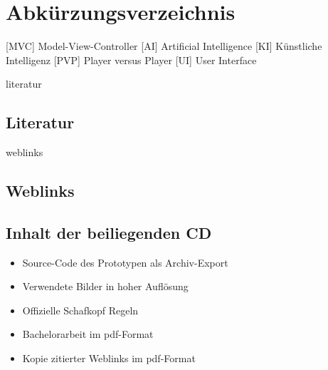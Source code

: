 \documentclass[
							a4paper, 
							11pt, 
							openany, 
							liststotoc,
							parskip=half, 
   							headings=normal
						]{scrreprt}
\begin{document}
{%

\listoffigures

\chapter*{Abkürzungsverzeichnis}
\begin{acronym}[MVC]
 [MVC] {Model-View-Controller}
 [AI] {Artificial Intelligence}
 [KI] {Künstliche Intelligenz}
 [PVP] {Player versus Player}
 [UI] {User Interface}
\end{acronym}

\lstlistoflistings


\begin{btSect}{literatur}
\section*{Literatur}
\btPrintCited
\end{btSect}

\clearpage
\begin{btSect}{weblinks}
\section*{Weblinks}
\btPrintCited
\end{btSect}



\renewcommand{\thesection}{\Alph{section}}
\appendix
{}
\section{Inhalt der beiliegenden CD}
\begin{itemize}
	\item Source-Code des Prototypen als Archiv-Export
	\item Verwendete Bilder in hoher Auflösung
	\item Offizielle Schafkopf Regeln
	\item Bachelorarbeit im pdf-Format
	\item Kopie zitierter Weblinks im pdf-Format
\end{itemize}

}
\end{document}
